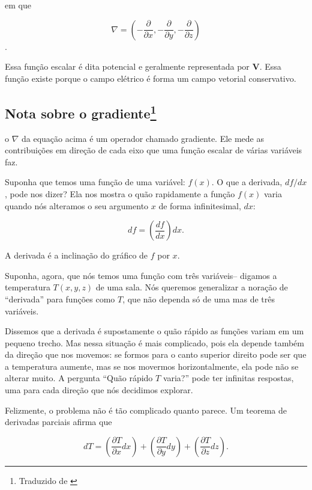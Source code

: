 em que

\begin{equation}\label{18.17}
    \nabla =\left( -\dfrac{\partial }{\partial x}, -\dfrac{\partial }{\partial y}, -\dfrac{\partial}{\partial z} \right)
\end{equation}.

Essa função escalar é dita potencial e geralmente representada por \textbf{V}. Essa função existe porque o campo elétrico é forma um campo vetorial conservativo.

\subsection{Nota sobre o gradiente\footnote{Traduzido de \cite{Griffiths2013introduction}}}
o $\nabla$ da equação acima é um operador chamado gradiente. Ele mede as contribuições em direção de cada eixo que uma função escalar de várias variáveis faz. 

Suponha que temos uma função de uma variável: $f(x)$. O que a derivada, $df/dx$, pode nos dizer? Ela nos mostra o quão rapidamente a função $f(x)$ varia quando nós alteramos o seu argumento $x$ de forma infinitesimal, $dx$:

\begin{equation}\label{18.18}
    df=\left( \dfrac{df}{dx} \right) dx.
\end{equation}

A derivada é a inclinação do gráfico de $f$ por $x$.

Suponha, agora, que nós temos uma função com três variáveis-- digamos a temperatura \linebreak $T(x,y,z)$ de uma sala. Nós queremos generalizar a noração de ``derivada'' para funções como $T$, que não dependa só de uma mas de três variáveis.

Dissemos que a derivada é supostamente o quão rápido as funções variam em um pequeno trecho. Mas nessa situação é mais complicado, pois ela depende também da direção que nos movemos: se formos para o canto superior direito pode ser que a temperatura aumente, mas se nos movermos horizontalmente, ela pode não se alterar muito. A pergunta ``Quão rápido $T$ varia?'' pode ter infinitas respostas, uma para cada direção que nós decidimos explorar.

Felizmente, o problema não é tão complicado quanto parece. Um teorema de derivadas parciais afirma que

\begin{equation}\label{18.19}
    dT=\left( \dfrac{\partial T}{\partial x} dx \right)+\left( \dfrac{\partial T}{\partial y} dy \right) + \left( \dfrac{\partial T}{\partial z} dz \right).
\end{equation}

